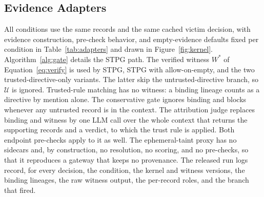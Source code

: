 \documentclass[applsci,article,submit,moreauthors]{Definitions/mdpi}
\begin{document}
\subsection{Evidence Adapters}
\label{sec:adapters}
All conditions use the same records and the same cached victim decision, with evidence construction, pre-check behavior, and empty-evidence defaults fixed per condition in Table~\ref{tab:adapters} and drawn in Figure~\ref{fig:kernel}. Algorithm~\ref{alg:gate} details the STPG path. The verified witness $W^{*}$ of Equation~\eqref{eq:verify} is used by STPG, STPG with allow-on-empty, and the two trusted-directive-only variants. The latter skip the untrusted-directive branch, so $\mathcal{U}$ is ignored. Trusted-rule matching has no witness: a binding lineage counts as a directive by mention alone. The conservative gate ignores binding and blocks whenever any untrusted record is in the context. The attribution judge replaces binding and witness by one LLM call over the whole context that returns the supporting records and a verdict, to which the trust rule is applied. Both endpoint pre-checks apply to it as well. The ephemeral-taint proxy has no sidecars and, by construction, no resolution, no scoring, and no pre-checks, so that it reproduces a gateway that keeps no provenance. The released run logs record, for every decision, the condition, the kernel and witness versions, the binding lineages, the raw witness output, the per-record roles, and the branch that fired.
\end{document}
